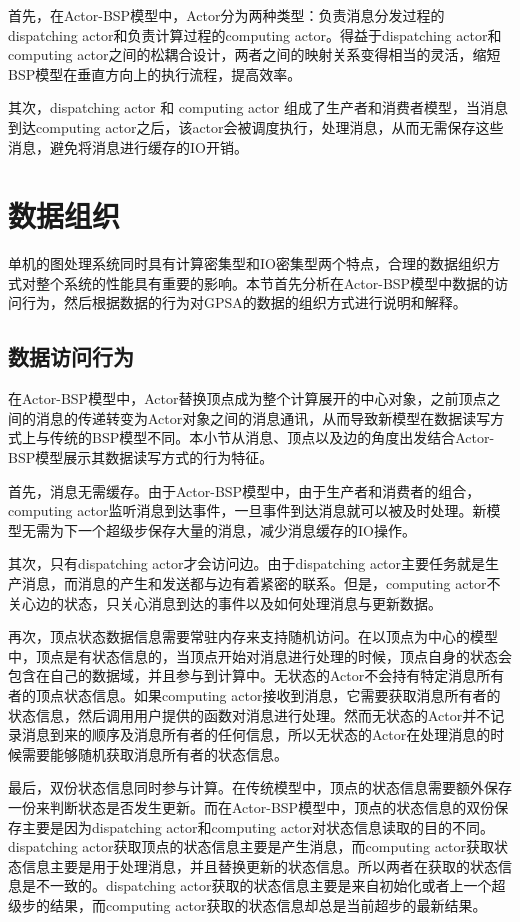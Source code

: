 首先，在Actor-BSP模型中，Actor分为两种类型：负责消息分发过程的dispatching actor和负责计算过程的computing actor。得益于dispatching actor和computing actor之间的松耦合设计，两者之间的映射关系变得相当的灵活，缩短BSP模型在垂直方向上的执行流程，提高效率。

其次，dispatching actor 和 computing actor 组成了生产者和消费者模型，当消息到达computing actor之后，该actor会被调度执行，处理消息，从而无需保存这些消息，避免将消息进行缓存的IO开销。

\section{数据组织}

单机的图处理系统同时具有计算密集型和IO密集型两个特点，合理的数据组织方式对整个系统的性能具有重要的影响。本节首先分析在Actor-BSP模型中数据的访问行为，然后根据数据的行为对GPSA的数据的组织方式进行说明和解释。

\subsection{数据访问行为}
在Actor-BSP模型中，Actor替换顶点成为整个计算展开的中心对象，之前顶点之间的消息的传递转变为Actor对象之间的消息通讯，从而导致新模型在数据读写方式上与传统的BSP模型不同。本小节从消息、顶点以及边的角度出发结合Actor-BSP模型展示其数据读写方式的行为特征。

首先，消息无需缓存。由于Actor-BSP模型中，由于生产者和消费者的组合，computing actor监听消息到达事件，一旦事件到达消息就可以被及时处理。新模型无需为下一个超级步保存大量的消息，减少消息缓存的IO操作。

其次，只有dispatching actor才会访问边。由于dispatching actor主要任务就是生产消息，而消息的产生和发送都与边有着紧密的联系。但是，computing actor不关心边的状态，只关心消息到达的事件以及如何处理消息与更新数据。

再次，顶点状态数据信息需要常驻内存来支持随机访问。在以顶点为中心的模型中，顶点是有状态信息的，当顶点开始对消息进行处理的时候，顶点自身的状态会包含在自己的数据域，并且参与到计算中。无状态的Actor不会持有特定消息所有者的顶点状态信息。如果computing actor接收到消息，它需要获取消息所有者的状态信息，然后调用用户提供的函数对消息进行处理。然而无状态的Actor并不记录消息到来的顺序及消息所有者的任何信息，所以无状态的Actor在处理消息的时候需要能够随机获取消息所有者的状态信息。

最后，双份状态信息同时参与计算。在传统模型中，顶点的状态信息需要额外保存一份来判断状态是否发生更新。而在Actor-BSP模型中，顶点的状态信息的双份保存主要是因为dispatching actor和computing actor对状态信息读取的目的不同。dispatching actor获取顶点的状态信息主要是产生消息，而computing actor获取状态信息主要是用于处理消息，并且替换更新的状态信息。所以两者在获取的状态信息是不一致的。dispatching actor获取的状态信息主要是来自初始化或者上一个超级步的结果，而computing actor获取的状态信息却总是当前超步的最新结果。



